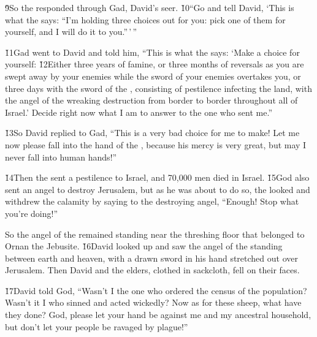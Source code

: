 \v{9}So the  responded through Gad, David's seer. \v{10}``Go and tell David, `This is what the  says: ``I'm holding three choices out for you: pick one of them for yourself, and I will do it to you.''\,'\,''

\v{11}Gad went to David and told him, ``This is what the  says: `Make a choice for yourself: \v{12}Either three years of famine, or three months of reversals as you are swept away by your enemies while the sword of your enemies overtakes you, or three days with the sword of the , consisting of pestilence infecting the land, with the angel of the  wreaking destruction from border to border throughout all of Israel.' Decide right now what I am to answer to the one who sent me.''

\v{13}So David replied to Gad, ``This is a very bad choice for me to make! Let me now please fall into the hand of the , because his mercy is very great, but may I never fall into human hands!''

\v{14}Then the  sent a pestilence to Israel, and 70,000 men died in Israel. \v{15}God also sent an angel to destroy Jerusalem, but as he was about to do so, the  looked and withdrew the calamity by saying to the destroying angel, ``Enough! Stop what you're doing!''

So the angel of the  remained standing near the threshing floor that belonged to Ornan the Jebusite. \v{16}David looked up and saw the angel of the  standing between earth and heaven, with a drawn sword in his hand stretched out over Jerusalem. Then David and the elders, clothed in sackcloth, fell on their faces.

\v{17}David told God, ``Wasn't I the one who ordered the census of the population? Wasn't it I who sinned and acted wickedly? Now as for these sheep, what have they done?  God, please let your hand be against me and my ancestral household, but don't let your people be ravaged by plague!''

